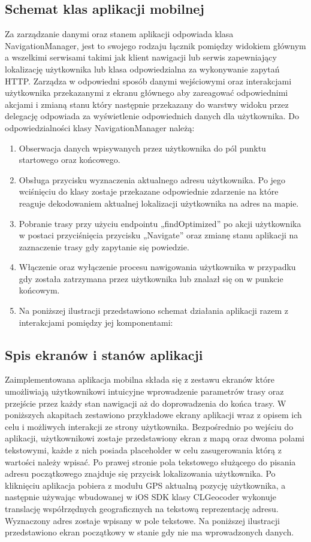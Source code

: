 \subsection{Schemat klas aplikacji mobilnej}

Za zarządzanie danymi oraz stanem aplikacji odpowiada klasa NavigationManager, jest to swojego rodzaju łącznik pomiędzy widokiem głównym a wszelkimi serwisami takimi jak klient nawigacji lub serwis zapewniający lokalizację użytkownika lub klasa odpowiedzialna za wykonywanie zapytań HTTP. Zarządza w odpowiedni sposób danymi wejściowymi oraz interakcjami użytkownika przekazanymi z ekranu głównego aby zareagować odpowiednimi akcjami i zmianą stanu który następnie przekazany do warstwy widoku przez delegację odpowiada za wyświetlenie odpowiednich danych dla użytkownika. Do odpowiedzialności klasy NavigationManager należą:

\begin{enumerate}
\item Obserwacja danych wpisywanych przez użytkownika do pól punktu startowego oraz końcowego.
\item Obsługa przycisku wyznaczenia aktualnego adresu użytkownika. Po jego wciśnięciu do klasy zostaje przekazane odpowiednie zdarzenie na które reaguje dekodowaniem aktualnej lokalizacji użytkownika na adres na mapie.
\item Pobranie trasy przy użyciu endpointu „findOptimized” po akcji użytkownika w postaci przyciśnięcia przycisku „Navigate” oraz zmianę stanu aplikacji na zaznaczenie trasy gdy zapytanie się powiedzie.
\item Włączenie oraz wyłączenie procesu nawigowania użytkownika w przypadku gdy została zatrzymana przez użytkownika lub znalazł się on w punkcie końcowym.
\item Na poniższej ilustracji przedstawiono schemat działania aplikacji razem z interakcjami pomiędzy jej komponentami:
\end{enumerate}

\subsection{Spis ekranów i stanów aplikacji}

Zaimplementowana aplikacja mobilna składa się z zestawu ekranów które umożliwiają użytkownikowi intuicyjne wprowadzenie parametrów trasy oraz przejście przez każdy stan nawigacji aż do doprowadzenia do końca trasy. W poniższych akapitach zestawiono przykładowe ekrany aplikacji wraz z opisem ich celu i możliwych interakcji ze strony użytkownika.
Bezpośrednio po wejściu do aplikacji, użytkownikowi zostaje przedstawiony ekran z mapą oraz dwoma polami tekstowymi, każde z nich posiada placeholder w celu zasugerowania którą z wartości należy wpisać. Po prawej stronie pola tekstowego służącego do pisania adresu początkowego znajduje się przycisk lokalizowania użytkownika. Po kliknięciu aplikacja pobiera z modułu GPS aktualną pozycję użytkownika, a następnie używając wbudowanej w iOS SDK klasy CLGeocoder wykonuje translację współrzędnych geograficznych na tekstową reprezentację adresu. Wyznaczony adres zostaje wpisany w pole tekstowe. Na poniższej ilustracji przedstawiono ekran początkowy w stanie gdy nie ma wprowadzonych danych.

